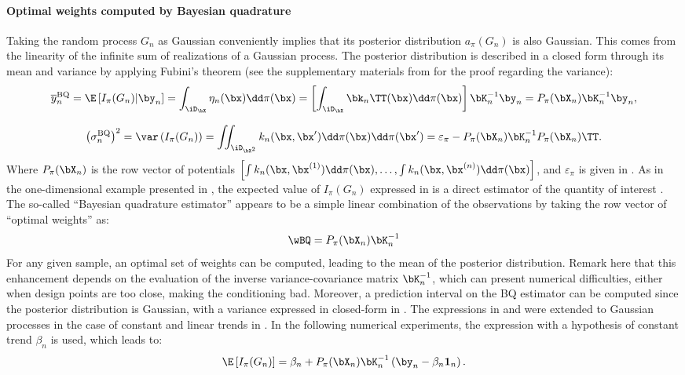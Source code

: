 \paragraph{Optimal weights computed by Bayesian quadrature}%
Taking the random process $G_n$ as Gaussian conveniently implies that its posterior distribution $a_\pi(G_n)$ is also Gaussian. 
This comes from the linearity of the infinite sum of realizations of a Gaussian process. 
The posterior distribution is described in a closed form through its mean and variance by applying Fubini's theorem (see the supplementary materials from \citealp{briol_oates_2019} for the proof regarding the variance): 
\begin{equation}
     \overline{y}_n^{\mathrm{BQ}} = \E\left[I_{\pi}(G_n) | \by_n \right] 
     = \int_{\iD_\bX} \eta_n(\bx) \dd \pi(\bx)
     = \left[\int_{\iD_\bX} \bk_n\TT(\bx) \dd \pi(\bx) \right] \bK_n^{-1} \by_n
     = P_\pi(\bX_n) \bK_n^{-1} \by_n,       
\label{eq:mean_post}
\end{equation}

\begin{equation}
    \left(\sigma_n^{\mathrm{BQ}}\right)^2 = \var\left(I_{\pi}(G_n) \right) 
    = \iint_{\iD_{\bX^2}} k_n(\bx, \bx') \dd \pi(\bx) \dd \pi(\bx') 
    = \varepsilon_\pi - P_\pi(\bX_n) \bK_n^{-1} P_\pi(\bX_n)\TT.
\label{eq:var_post}
\end{equation}
\noindent
Where $P_\pi(\bX_n)$ is the row vector of potentials $\left[\int k_n(\bx, \bx^{(1)}) \dd \pi(\bx), \dots, \int k_n(\bx, \bx^{(n)}) \dd \pi(\bx)\right]$, and $\varepsilon_\pi$ is given in . 
As in the one-dimensional example presented in , the expected value of $I_{\pi}(G_n)$ expressed in  is a direct estimator of the quantity of interest . 
The so-called ``Bayesian quadrature estimator'' appears to be a simple linear combination of the observations by taking the row vector of ``optimal weights'' as: 
\begin{equation}
    \wBQ = P_\pi(\bX_n) \bK_n^{-1}
    \label{eq:bq_weights}
\end{equation}
For any given sample, an optimal set of weights can be computed, leading to the mean of the posterior distribution. 
Remark here that this enhancement depends on the evaluation of the inverse variance-covariance matrix $\bK_n^{-1}$, which can present numerical difficulties, either when design points are too close, making the conditioning bad. 
Moreover, a prediction interval on the BQ estimator can be computed since the posterior distribution is Gaussian, with a variance expressed in closed-form in . 
The expressions in  and  were extended to Gaussian processes in the case of constant and linear trends in \cite{pronzato_zhigljavsky_2020}. 
In the following numerical experiments, the expression with a hypothesis of constant trend $\beta_n$ is used, which leads to:
\begin{equation}
     \E\left[I_{\pi}(G_n)\right] = \beta_n + P_\pi(\bX_n) \bK_n^{-1} \left(\by_n - \beta_n \mathbf{1}_n \right).
     \label{eq:mean_post_cst}
\end{equation}

